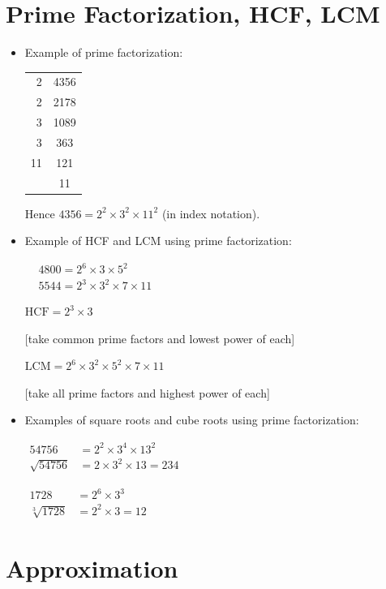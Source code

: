 \documentclass[twocolumn]{article}
\begin{document}
\section*{Prime Factorization, HCF, LCM} 

\begin{itemize}
\item Example of prime factorization:

\begin{tabular}{r|c}
	2 & 4356 \\
	\cline { 2 - 2 } 2 & 2178 \\
	\cline { 2 - 2 } 3 & 1089 \\
	\cline { 2 - 2 } 3 & 363 \\
	\cline { 2 - 2 } 11 & 121 \\
	\cline { 2 - 2 } & 11 \\
	\hline 
\end{tabular}

Hence $4356=2^2 \times 3^2 \times 11^2$ (in index notation).

\item Example of HCF and LCM using prime factorization:

$
\begin{aligned}
	& 4800=2^6 \times 3 \times 5^2 \\
	& 5544=2^3 \times 3^2 \times 7 \times 11
\end{aligned}
$

$\mathrm{HCF}=2^3 \times 3$

[take common prime factors and lowest power of each]

$\mathrm{LCM}=2^6 \times 3^2 \times 5^2 \times 7 \times 11$

[take all prime factors and highest power of each]

\item Examples of square roots and cube roots using prime factorization:

$\begin{aligned} 54756 & =2^2 \times 3^4 \times 13^2 \\ \sqrt{54756} & =2 \times 3^2 \times 13 = 234\end{aligned}$

$\begin{aligned} 1728 & =2^6 \times 3^3 \\ \sqrt[3]{1728} & =2^2 \times 3 = 12\end{aligned}$
\end{itemize}

\section*{Approximation}
\end{document}
